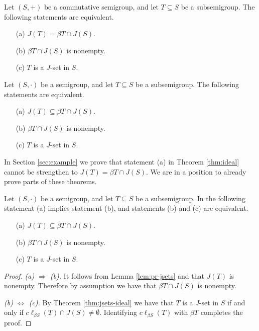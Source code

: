 \begin{thm}
  Let $(S, +)$ be a commutative semigroup, and let $T \subseteq S$ be a subsemigroup.
  The following statements are equivalent.
  \begin{itemize}
    \item[(a)]
      $J(T) = \beta T \cap J(S)$.

    \item[(b)]
      $\beta T \cap J(S)$ is nonempty.

    \item[(c)]
      $T$ is a $J$-set in $S$. 
  \end{itemize}
\end{thm}

\begin{thm}
  \label{thm:ideal}
  Let $(S, \cdot)$ be a semigroup, and let $T \subseteq S$ be a subsemigroup.
  The following statements are equivalent.
  \begin{itemize}
    \item[(a)]
      $J(T) \subseteq \beta T \cap J(S)$.

    \item[(b)]
      $\beta T \cap J(S)$ is nonempty.

    \item[(c)]
      $T$ is a $J$-set in $S$. 
  \end{itemize}
\end{thm}

In Section \ref{sec:example} we prove that statement (a) in Theorem \ref{thm:ideal} cannot be strengthen to $J(T) = \beta T \cap J(S)$. 
We are in a position to already prove parts of these theorems.

\begin{thm}
  Let $(S, \cdot)$ be a semigroup, and let $T \subseteq S$ be a subsemigroup.
  In the following statement (a) implies statement (b), and statements (b) and (c) are equivalent.
  \begin{itemize}
    \item[(a)]
      $J(T) \subseteq \beta T \cap J(S)$.

    \item[(b)]
      $\beta T \cap J(S)$ is nonempty.

    \item[(c)]
      $T$ is a $J$-set in $S$. 
  \end{itemize}
\end{thm}
\begin{proof}
  \textsl{(a) $\Rightarrow$ (b).}
  It follows from Lemma \ref{lem:pr-jsets} and \cite[Theorem 3.11]{Hindman:1998fk} that $J(T)$ is nonempty. 
  Therefore by assumption we have that $\beta T \cap J(S)$ is nonempty. 

  \textsl{(b) $\iff$ (c).}
  By Theorem \ref{thm:jsets-ideal} we have that $T$ is a $J$-set in $S$ if and only if $c \ell_{\beta S} (T) \cap J(S) \ne \emptyset$. 
  Identifying $c \ell_{\beta S}(T)$ with $\beta T$ completes the proof.
\end{proof}


